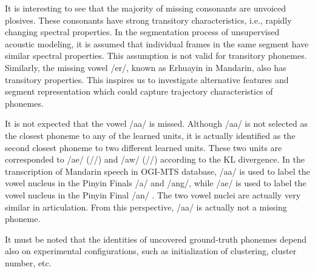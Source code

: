\documentclass[a4paper]{article}
\begin{document}
It is interesting to see that the majority of missing consonants are unvoiced plosives. These consonants have strong transitory characteristics, i.e., rapidly changing spectral properties. 
In the segmentation process of unsupervised acoustic modeling, it is assumed that individual frames in the same segment have similar spectral properties. This assumption is not valid for transitory phonemes.
Similarly, the missing vowel /er/, known as Erhuayin in Mandarin, also has transitory properties.
This inspires us to investigate alternative features and segment representation which could capture trajectory characteristics of phonemes. 

It is not expected that the vowel /aa/ is missed. Although /aa/ is not selected as the closest phoneme to any of the learned units, it is actually identified as the second closest phoneme to two different learned units. These two units are corresponded to /ae/ (//) and /aw/ (//) according to the KL divergence. In the transcription of Mandarin speech in OGI-MTS database, /aa/ is used to label the vowel nucleus in the Pinyin Finals /a/ and /ang/, while /ae/ is used to label the vowel nucleus in the Pinyin Final /an/ \cite{wiki-nourl:xxx}. The two vowel nuclei are actually very similar in articulation. 
From this perspective, /aa/ is actually not a missing phoneme.

It must be noted that the identities of uncovered ground-truth phonemes depend also on experimental configurations, such as initialization of clustering, cluster number, etc. 
\end{document}
